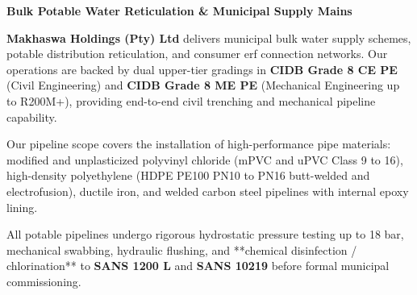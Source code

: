 \documentclass[a4paper,11pt]{article}
\begin{document}
\noindent
\begin{minipage}[t]{0.62\textwidth}
    \vspace{0pt}
    {\large\bfseries\color{mhnavy} Bulk Potable Water Reticulation \& Municipal Supply Mains}
    \vspace{0.12cm}

    {\fontsize{9pt}{13pt}\selectfont\color{mhtext}
    \textbf{Makhaswa Holdings (Pty) Ltd} delivers municipal bulk water supply schemes, potable distribution reticulation, and consumer erf connection networks. Our operations are backed by dual upper-tier gradings in \textbf{CIDB Grade 8 CE PE} (Civil Engineering) and \textbf{CIDB Grade 8 ME PE} (Mechanical Engineering up to R200M+), providing end-to-end civil trenching and mechanical pipeline capability.
    }

    \vspace{0.22cm}

    {\fontsize{9pt}{13pt}\selectfont\color{mhtext}
    Our pipeline scope covers the installation of high-performance pipe materials: modified and unplasticized polyvinyl chloride (mPVC and uPVC Class 9 to 16), high-density polyethylene (HDPE PE100 PN10 to PN16 butt-welded and electrofusion), ductile iron, and welded carbon steel pipelines with internal epoxy lining.
    }

    \vspace{0.22cm}

    {\fontsize{9pt}{13pt}\selectfont\color{mhtext}
    All potable pipelines undergo rigorous hydrostatic pressure testing up to 18 bar, mechanical swabbing, hydraulic flushing, and **chemical disinfection / chlorination** to \textbf{SANS 1200 L} and \textbf{SANS 10219} before formal municipal commissioning.
    }
\end{minipage}
\hfill
\end{document}
